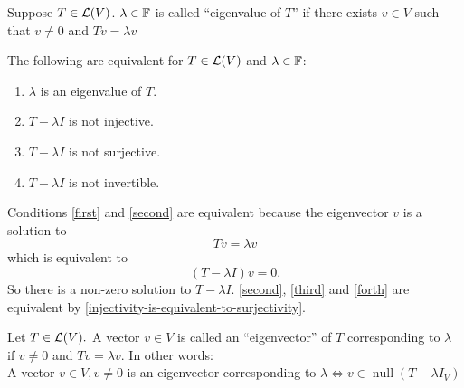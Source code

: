 \begin{mydef} [eigenvalue]
  Suppose $T\in \mathcal{L} (V)$. $\lambda \in \mathbb{F}$ is called ``eigenvalue of $T$'' if there exists $v \in V$ such that $v \neq 0$ and $Tv = \lambda v$
\end{mydef}

\setcounter{thm}{6}
\begin{thm} 
  \label{thm: equivalent conditions to be an eigenvalue}
  The following are equivalent for $T \in \mathcal{L}(V)$ and $\lambda \in \mathbb{F}$:
  \begin{enumerate}[label=(\alph*)]
    \item $\lambda$ is an eigenvalue of $T$. \label{first}
    \item $T-\lambda I$ is not injective. \label{second}
    \item $T-\lambda I$ is not surjective. \label{third}
    \item $T-\lambda I$ is not invertible. \label{forth}
  \end{enumerate}
\end{thm}
\begin{prf}
  Conditions \ref{first} and \ref{second} are equivalent because the eigenvector $v$ is a solution to 
  \begin{equation}
    Tv=\lambda v
  \end{equation} which is equivalent to 
  \begin{equation}
    (T-\lambda I)v=0.
  \end{equation} So there is a non-zero solution to $T-\lambda I$.
  \ref{second}, \ref{third} and \ref{forth} are equivalent by \ref{injectivity-is-equivalent-to-surjectivity}.
\end{prf}

\setcounter{thm}{7}
\begin{mydef} [eigenvector]
  Let $T\in \mathcal{L}(V).$ A vector $v \in V$ is called an ``eigenvector'' of $T$ corresponding to $\lambda$ if $v\neq 0$ and $Tv = \lambda v$.
  In other words:
  \\A vector $v\in V, v \neq 0$ is an eigenvector corresponding to $\lambda \iff v \in \operatorname{null}(T-\lambda I_V)$
\end{mydef}

